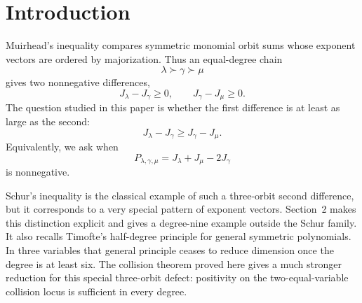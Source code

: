 \documentclass[11pt]{article}
\theoremstyle{definition}
\begin{document}
\begin{abstract}
We also give the exact two-variable criterion, extend the theorem to rational exponent vectors by denominator clearing, exhibit explicit low-degree inequalities beyond Schur, establish a rigidity property of the classical Schur chain, and derive a strict refinement of the cubic Schur inequality through a midpoint incomparable with the classical one.  We have also investigated analogous questions for \(n\ge4\) variables; the higher-dimensional results require a different development and will be presented separately.

\textbf{Keywords:} majorization; Muirhead inequality; Schur inequality; symmetric polynomial inequality; collision positivity; total positivity; reciprocal symmetry.
\end{abstract}

\section{Introduction}

Muirhead's inequality compares symmetric monomial orbit sums whose exponent vectors are ordered by majorization.  Thus an equal-degree chain
\begin{equation*}
\lambda\succ\gamma\succ\mu
\end{equation*}
gives two nonnegative differences,
\begin{equation*}
J_\lambda-J_\gamma\ge0,
\qquad
J_\gamma-J_\mu\ge0.
\end{equation*}
The question studied in this paper is whether the first difference is at least as large as the second:
\begin{equation*}
J_\lambda-J_\gamma
\ge
J_\gamma-J_\mu.
\end{equation*}
Equivalently, we ask when
\begin{equation*}
P_{\lambda,\gamma,\mu}
=
J_\lambda+J_\mu-2J_\gamma
\end{equation*}
is nonnegative.

Schur's inequality is the classical example of such a three-orbit second difference, but it corresponds to a very special pattern of exponent vectors.  Section~2 makes this distinction explicit and gives a degree-nine example outside the Schur family.  It also recalls Timofte's half-degree principle for general symmetric polynomials.  In three variables that general principle ceases to reduce dimension once the degree is at least six.  The collision theorem proved here gives a much stronger reduction for this special three-orbit defect: positivity on the two-equal-variable collision locus is sufficient in every degree.
\end{document}
